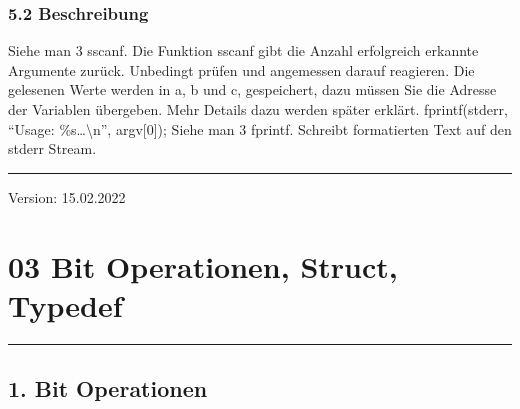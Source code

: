 \documentclass[a4paper,10pt,english]{report}
\begin{document}
\subsection{5.2 Beschreibung}
\label{\detokenize{P02_Funktionen_Datentyp_enum/README:beschreibung}}
\sphinxAtStartPar
Siehe man 3 sscanf.
Die Funktion sscanf gibt die Anzahl erfolgreich erkannte Argumente zurück. Unbedingt prüfen und angemessen darauf reagieren.
Die gelesenen Werte werden in a, b und c, gespeichert, dazu müssen Sie die Adresse der Variablen übergeben. Mehr Details dazu werden später erklärt.
fprintf(stderr, “Usage: \%s…\textbackslash{}n”, argv{[}0{]});	Siehe man 3 fprintf.
Schreibt formatierten Text auf den stderr Stream.


\bigskip\hrule\bigskip


\sphinxAtStartPar
Version: 15.02.2022


\chapter{03 \sphinxhyphen{} Bit Operationen, Struct, Typedef}
\label{\detokenize{P03_Bit_Operation_struct_typedef/README:bit-operationen-struct-typedef}}\label{\detokenize{P03_Bit_Operation_struct_typedef/README::doc}}

\bigskip\hrule\bigskip



\section{1. Bit Operationen}
\label{\detokenize{P03_Bit_Operation_struct_typedef/README:bit-operationen}}
\sphinxAtStartPar
{}
\end{document}
